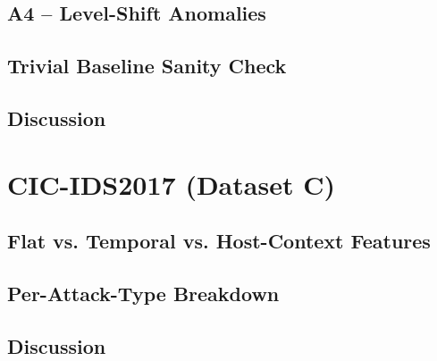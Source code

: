 \subsection{A4 -- Level-Shift Anomalies}

\subsection{Trivial Baseline Sanity Check}

\subsection{Discussion}

\section{CIC-IDS2017 (Dataset C)}

\subsection{Flat vs. Temporal vs. Host-Context Features}

\subsection{Per-Attack-Type Breakdown}

\subsection{Discussion}
